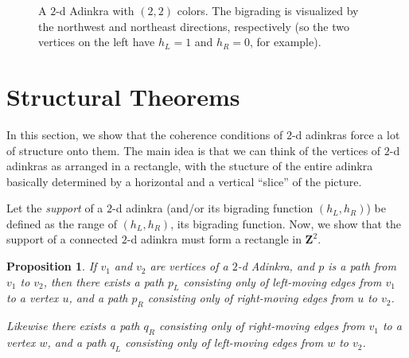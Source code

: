 \documentclass[12pt,twoside,singlespace]{article}
\numberwithin{equation}{section}
\newtheorem{prop}[equation]{Proposition}
\theoremstyle{definition}
\newcommand{\ZZ}{\mathbf{Z}}
\begin{document}
\begin{figure}[htb]
\begin{center}

\caption{A $2$-d Adinkra with $(2,2)$ colors. The bigrading is visualized by the northwest and northeast directions, respectively (so the two vertices on the left have $h_L = 1$ and $h_R = 0$, for example). \label{fig:2d-example}}
\end{center}
\end{figure}

\section{Structural Theorems}
\label{sec:structural}

In this section, we show that the coherence conditions of $2$-d adinkras force a lot of structure onto them. The main idea is that we can think of the vertices of $2$-d adinkras as arranged in a rectangle, with the stucture of the entire adinkra basically determined by a horizontal and a vertical ``slice'' of the picture.

Let the \emph{support} of a $2$-d adinkra (and/or its bigrading function $(h_L,h_R)$) be defined as the range of $(h_L,h_R)$, its bigrading function. Now, we show that the support of a connected $2$-d adinkra must form a rectangle in $\ZZ^2$.

\begin{prop}
\label{prop:reorderpath}
If $v_1$ and $v_2$ are vertices of a $2$-d Adinkra, and $p$ is a path from $v_1$ to $v_2$, then there exists a path $p_L$ consisting only of left-moving edges from $v_1$ to a vertex $u$, and a path $p_R$ consisting only of right-moving edges from $u$ to $v_2$.

Likewise there exists a path $q_R$ consisting only of right-moving edges from $v_1$ to a vertex $w$, and a path $q_L$ consisting only of left-moving edges from $w$ to $v_2$.
\end{prop}
\end{document}
